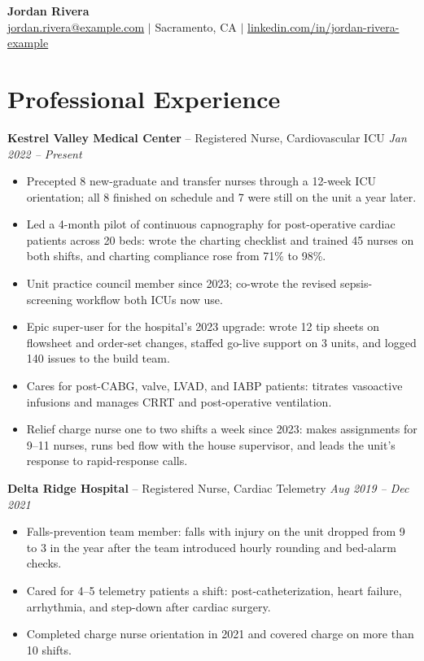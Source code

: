 \documentclass[11pt, letterpaper]{article}
\begin{document}
\pagestyle{empty}

\begin{center}
  \textbf{\LARGE Jordan Rivera} \\[2pt]
  \href{mailto:jordan.rivera@example.com}{jordan.rivera@example.com} $|$ Sacramento, CA $|$ \href{https://linkedin.com/in/jordan-rivera-example}{linkedin.com/in/jordan-rivera-example}
\end{center}
\vspace{-15pt}

\section{Professional Experience}

\textbf{Kestrel Valley Medical Center} -- {Registered Nurse, Cardiovascular ICU}
\hfill \textit{Jan 2022 – Present}
\begin{itemize}
  \item Precepted 8 new-graduate and transfer nurses through a 12-week ICU orientation; all 8 finished on schedule and 7 were still on the unit a year later.
  \item Led a 4-month pilot of continuous capnography for post-operative cardiac patients across 20 beds: wrote the charting checklist and trained 45 nurses on both shifts, and charting compliance rose from 71\% to 98\%.
  \item Unit practice council member since 2023; co-wrote the revised sepsis-screening workflow both ICUs now use.
  \item Epic super-user for the hospital's 2023 upgrade: wrote 12 tip sheets on flowsheet and order-set changes, staffed go-live support on 3 units, and logged 140 issues to the build team.
  \item Cares for post-CABG, valve, LVAD, and IABP patients: titrates vasoactive infusions and manages CRRT and post-operative ventilation.
  \item Relief charge nurse one to two shifts a week since 2023: makes assignments for 9–11 nurses, runs bed flow with the house supervisor, and leads the unit's response to rapid-response calls.
\end{itemize}
\vspace{2pt}
\textbf{Delta Ridge Hospital} -- {Registered Nurse, Cardiac Telemetry}
\hfill \textit{Aug 2019 – Dec 2021}
\begin{itemize}
  \item Falls-prevention team member: falls with injury on the unit dropped from 9 to 3 in the year after the team introduced hourly rounding and bed-alarm checks.
  \item Cared for 4–5 telemetry patients a shift: post-catheterization, heart failure, arrhythmia, and step-down after cardiac surgery.
  \item Completed charge nurse orientation in 2021 and covered charge on more than 10 shifts.
\end{itemize}
\vspace{2pt}
\end{document}
